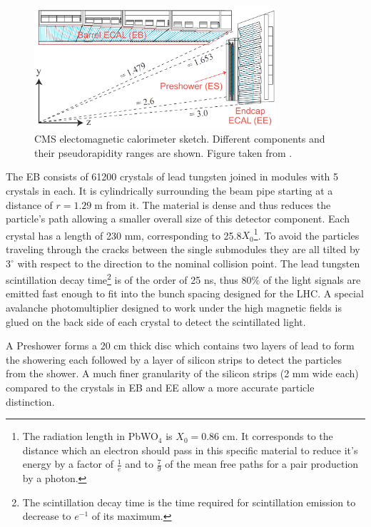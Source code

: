 \begin{figure}[t]
  \centering
  \includegraphics[width=0.8\textwidth]{02_experimental_setup/plots/Figures_Experimental_Apparatus_ECALRapidity.png}
  \caption{CMS electomagnetic calorimeter sketch. Different components and their pseudorapidity ranges are shown. Figure taken from \cite{Isildak:2013kfa}.}
  \label{fig:ecal}
\end{figure}

The EB consists of 61200 crystals of lead tungsten joined in modules with 5 crystals in each. It is
cylindrically surrounding the beam pipe starting at a distance of $r = 1.29\;$m from it. 
The material is dense and thus reduces the particle's path allowing a smaller overall size of this detector component. 
Each crystal has a length of 230 mm, corresponding to 25.8$X_{0}$\footnote{The radiation length in PbWO$_{4}$ is 
$X_{0}=0.86$ cm. It corresponds to the distance which an electron should pass in this specific material to reduce it's 
energy by a factor of $\frac{1}{e}$ and to $\frac{7}{9}$ of the mean free paths for a pair production by a photon.}. 
To avoid the particles traveling through the cracks between the single submodules they are all tilted by 3$^{\circ}$ with 
respect to the direction to the nominal collision point. The lead tungsten scintillation decay time\footnote{The scintillation decay 
time is the time required for scintillation emission to decrease to $e^{-1}$ of its maximum.} is of the order of 25 ns, thus 80$\%$ 
of the light signals are emitted fast enough to fit into the bunch spacing designed for the LHC. A special avalanche 
photomultiplier designed to work under the high magnetic fields is glued on the back side of each crystal to detect the scintillated light\cite{APDVPT}.

A Preshower forms a 20 cm thick disc which contains two layers of lead to form the showering each followed by a layer of silicon strips to
detect the particles from the shower. A much finer granularity of the silicon strips (2 mm wide each) compared to the 
crystals in EB and EE allow a more accurate particle distinction.


